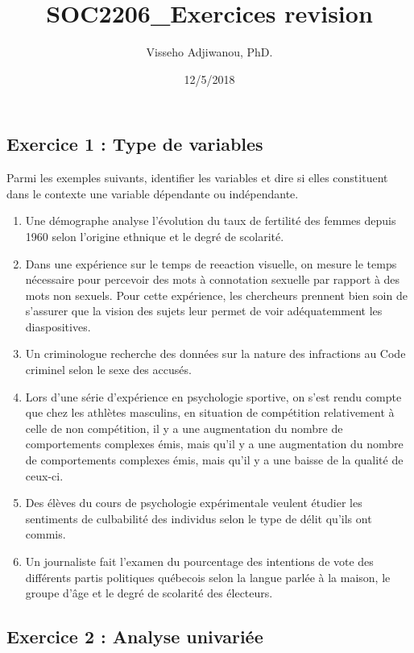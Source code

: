 \documentclass[]{article}
\title{SOC2206\_Exercices revision}
\author{Visseho Adjiwanou, PhD.}
\date{12/5/2018}
\begin{document}
\maketitle

\subsection{Exercice 1 : Type de
variables}\label{exercice-1-type-de-variables}

Parmi les exemples suivants, identifier les variables et dire si elles
constituent dans le contexte une variable dépendante ou indépendante.

\begin{enumerate}
\def\labelenumi{\arabic{enumi}.}
\item
  Une démographe analyse l'évolution du taux de fertilité des femmes
  depuis 1960 selon l'origine ethnique et le degré de scolarité.
\item
  Dans une expérience sur le temps de reeaction visuelle, on mesure le
  temps nécessaire pour percevoir des mots à connotation sexuelle par
  rapport à des mots non sexuels. Pour cette expérience, les chercheurs
  prennent bien soin de s'assurer que la vision des sujets leur permet
  de voir adéquatemment les diaspositives.
\item
  Un criminologue recherche des données sur la nature des infractions au
  Code criminel selon le sexe des accusés.
\item
  Lors d'une série d'expérience en psychologie sportive, on s'est rendu
  compte que chez les athlètes masculins, en situation de compétition
  relativement à celle de non compétition, il y a une augmentation du
  nombre de comportements complexes émis, mais qu'il y a une
  augmentation du nombre de comportements complexes émis, mais qu'il y a
  une baisse de la qualité de ceux-ci.
\item
  Des élèves du cours de psychologie expérimentale veulent étudier les
  sentiments de culbabilité des individus selon le type de délit qu'ils
  ont commis.
\item
  Un journaliste fait l'examen du pourcentage des intentions de vote des
  différents partis politiques québecois selon la langue parlée à la
  maison, le groupe d'âge et le degré de scolarité des électeurs.
\end{enumerate}

\subsection{Exercice 2 : Analyse
univariée}\label{exercice-2-analyse-univariee}
\end{document}
